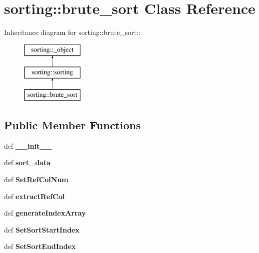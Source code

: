 \hypertarget{classsorting_1_1brute__sort}{
\section{sorting::brute\_\-sort Class Reference}
\label{d0/da8/classsorting_1_1brute__sort}
}
Inheritance diagram for sorting::brute\_\-sort::\begin{figure}[H]
\begin{center}
\leavevmode
\includegraphics[height=3cm]{d0/da8/classsorting_1_1brute__sort}
\end{center}
\end{figure}
\subsection*{Public Member Functions}
\begin{DoxyCompactItemize}
\item 
\hypertarget{classsorting_1_1brute__sort_aa845948c1030d3cd0922c3322f16f789}{
def {\bfseries \_\-\_\-init\_\-\_\-}}
\label{d0/da8/classsorting_1_1brute__sort_aa845948c1030d3cd0922c3322f16f789}

\item 
\hypertarget{classsorting_1_1brute__sort_a0d206532a6c29ac13e0f76b1b6cfc9ca}{
def {\bfseries sort\_\-data}}
\label{d0/da8/classsorting_1_1brute__sort_a0d206532a6c29ac13e0f76b1b6cfc9ca}

\item 
\hypertarget{classsorting_1_1brute__sort_a07dc13d397462f069f699a721198ce41}{
def {\bfseries SetRefColNum}}
\label{d0/da8/classsorting_1_1brute__sort_a07dc13d397462f069f699a721198ce41}

\item 
\hypertarget{classsorting_1_1brute__sort_a5969ba91785fa7e8185c0a42ecd5b6f5}{
def {\bfseries extractRefCol}}
\label{d0/da8/classsorting_1_1brute__sort_a5969ba91785fa7e8185c0a42ecd5b6f5}

\item 
\hypertarget{classsorting_1_1brute__sort_a7e948e1976abc0cac6913f8fd89c62c7}{
def {\bfseries generateIndexArray}}
\label{d0/da8/classsorting_1_1brute__sort_a7e948e1976abc0cac6913f8fd89c62c7}

\item 
\hypertarget{classsorting_1_1brute__sort_a99e2001754a0dab53f293119f59f4c27}{
def {\bfseries SetSortStartIndex}}
\label{d0/da8/classsorting_1_1brute__sort_a99e2001754a0dab53f293119f59f4c27}

\item 
\hypertarget{classsorting_1_1brute__sort_a584b9ceb12f2bfa3f370e8269a7e028e}{
def {\bfseries SetSortEndIndex}}
\label{d0/da8/classsorting_1_1brute__sort_a584b9ceb12f2bfa3f370e8269a7e028e}

\end{DoxyCompactItemize}
